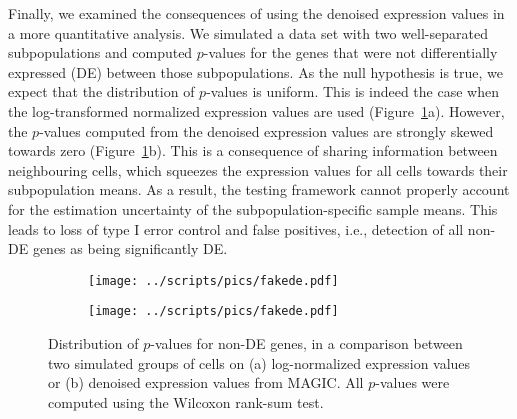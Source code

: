 \documentclass[10pt,letterpaper]{article}
\begin{document}
Finally, we examined the consequences of using the denoised expression values in a more quantitative analysis.
We simulated a data set with two well-separated subpopulations and computed $p$-values for the genes that were not differentially expressed (DE) between those subpopulations.
As the null hypothesis is true, we expect that the distribution of $p$-values is uniform.
This is indeed the case when the log-transformed normalized expression values are used (Figure~\ref{fig:twoclusters}a).
However, the $p$-values computed from the denoised expression values are strongly skewed towards zero (Figure~\ref{fig:twoclusters}b).
This is a consequence of sharing information between neighbouring cells, which squeezes the expression values for all cells towards their subpopulation means.
As a result, the testing framework cannot properly account for the estimation uncertainty of the subpopulation-specific sample means.
This leads to loss of type I error control and false positives, i.e., detection of all non-DE genes as being significantly DE.

\begin{figure}[btp]
\centering
\begin{subfigure}[b]{0.49\textwidth}
    \texttt{[image: ../scripts/pics/fakede.pdf]}
    \caption{}
\end{subfigure}
\begin{subfigure}[b]{0.49\textwidth}
    \texttt{[image: ../scripts/pics/fakede.pdf]}
    \caption{}
\end{subfigure}
\caption{Distribution of $p$-values for non-DE genes, 
in a comparison between two simulated groups of cells on (a) log-normalized expression values or (b) denoised expression values from MAGIC.
All $p$-values were computed using the Wilcoxon rank-sum test.}
\label{fig:twoclusters}
\end{figure}
\end{document}
